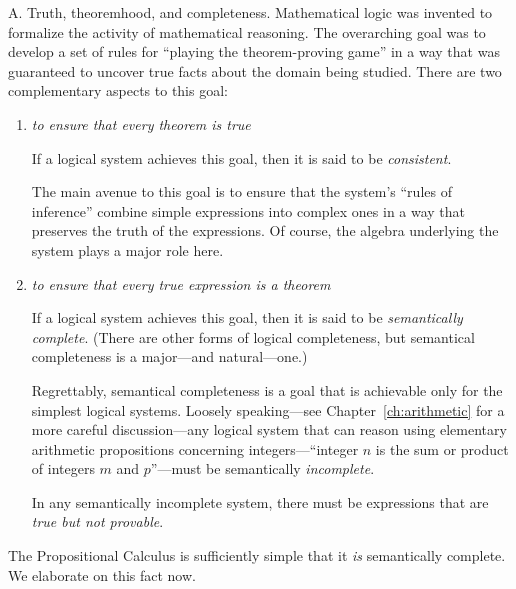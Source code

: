 {\small\sf A. Truth, theoremhood, and completeness}.
Mathematical logic was invented to formalize the activity of
mathematical reasoning.  The overarching goal was to develop a set of
rules for ``playing the theorem-proving game'' in a way that was
guaranteed to uncover true facts about the domain being studied.
There are two complementary aspects to this goal:
\begin{enumerate}
\item
{\em to ensure that every theorem is true}

If a logical system achieves this goal, then it is said to be {\it
  consistent}. 

The main avenue to this goal is to ensure that the system's ``rules of
inference'' combine simple expressions into complex ones in a way that
preserves the truth of the expressions.  Of course, the algebra
underlying the system plays a major role here.

\item
{\em to ensure that every true expression is a theorem}

If a logical system achieves this goal, then it is said to be {\it
semantically complete}. 
(There are other forms of logical completeness, but semantical
completeness is a major---and natural---one.)

Regrettably, semantical completeness is a goal that is achievable only
for the simplest logical systems.  Loosely speaking---see
Chapter~\ref{ch:arithmetic} for a more careful discussion---any
logical system that can reason using elementary arithmetic propositions
concerning integers---``integer $n$ is the sum or product of integers
$m$ and $p$''---must be semantically {\em incomplete}.

In any semantically incomplete system, there must be expressions that
are {\em true but not provable}.
\medskip

\noindent {}
\end{enumerate}
The Propositional Calculus is sufficiently simple that it {\em is}
semantically complete.  We elaborate on this fact now.

